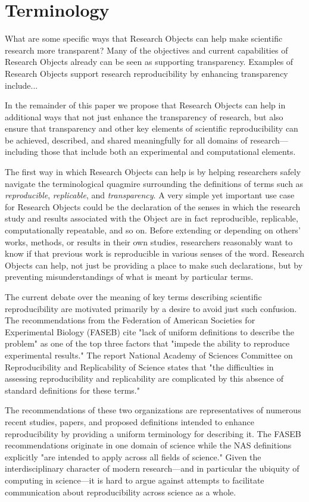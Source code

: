 \section{Terminology}

What are some specific ways that Research Objects can help make scientific research more transparent?
Many of the objectives and current capabilities of Research Objects already can be seen as supporting 
	transparency.
Examples of Research Objects support research reproducibility by enhancing transparency include...

In the remainder of this paper we propose that Research Objects can help in additional ways that not
	just enhance the transparency of research, but also ensure that transparency and other key elements
	of scientific reproducibility can be achieved, described, and shared meaningfully for all domains
	of research---including those that include both an experimental and computational elements.

The first way in which Research Objects can help is by helping researchers safely navigate the 
	terminological quagmire surrounding the definitions of terms such as \emph{reproducible},
	\emph{replicable}, and \emph{transparency}.
A very simple yet important use case for Research Objects could be the declaration of the senses in
	which the research study and results associated with the Object are in fact reproducible, replicable,
	computationally repeatable, and so on.
Before extending or depending on others' works, methods, or results in their own studies, researchers
	reasonably want to know if that previous work is reproducible in various senses of the word.
Research Objects can help, not just be providing a place to make such declarations, but by preventing
	misunderstandings of what is meant by particular terms.

The current debate over the meaning of key terms describing 
	scientific reproducibility are motivated primarily by a desire to avoid just such confusion.
The recommendations from the Federation of
	American Societies for Experimental Biology (FASEB) cite "lack of uniform definitions to describe the problem" 
	as one of the top three factors that "impede the ability to reproduce experimental results."
 The report National Academy of Sciences Committee on Reproducibility and Replicability of Science states
	that "the difficulties in assessing reproducibility and replicability are complicated by this absence of
	standard definitions for these terms."

The recommendations of these two organizations are representatives of numerous recent studies, papers, 
	and proposed definitions intended to enhance reproducibility by providing a uniform terminology
	for describing it.  
The FASEB recommendations originate in one domain of science while the NAS definitions explicitly 
	"are intended to apply across all fields of science."
Given the interdisciplinary character of modern research---and in particular the ubiquity of computing in science---it 
	is hard to argue against attempts to facilitate communication about reproducibility across science as a whole.

